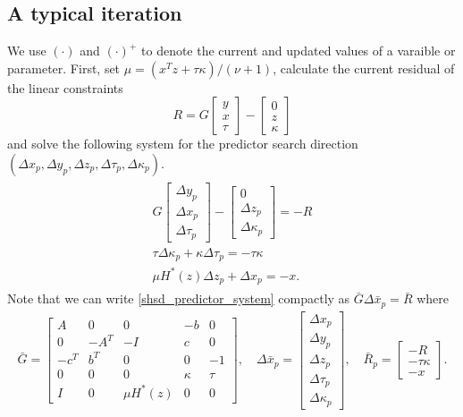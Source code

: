 \documentclass[11pt]{article}
\theoremstyle{definition}
\theoremstyle{plain}
\begin{document}
\subsection{A typical iteration}
We use $(\cdot)$ and $(\cdot)^+$ to denote the current and updated values of a varaible or parameter. First, set $\mu = \left(x^T z + \tau \kappa\right)/\left(\nu+1\right)$, calculate the current residual of the linear constraints
\[R = G \begin{bmatrix}
y \\ x \\ \tau
\end{bmatrix} - 
\begin{bmatrix}
0 \\ z \\ \kappa 
\end{bmatrix}\]
and solve the following system for the predictor search direction $(\Delta x_p, \Delta y_p, \Delta z_p, \Delta \tau_p, \Delta \kappa_p)$.
\begin{align}
\begin{split}
G\begin{bmatrix}
\Delta y_p \\ \Delta x_p \\ \Delta \tau_p
\end{bmatrix} - 
\begin{bmatrix}
0 \\ \Delta z_p \\ \Delta \kappa_p
\end{bmatrix} = -R \\[1ex]
\tau\Delta \kappa_p+\kappa\Delta \tau_p = -\tau\kappa \\[1ex]
\mu H^*(z)\Delta z_p + \Delta x_p = -x. 
\end{split}	 \label{shsd_predictor_system}
\end{align}
Note that we can write \eqref{shsd_predictor_system} compactly as $\bar G \Delta \bar{x}_p = \bar{R}$ where 
\begin{align} \label{G_bar_etc_def}
\bar{G} = \begin{bmatrix}
A & 0 &0 & -b & 0 \\
0 & -A^T & -I & c & 0 \\
-c^T & b^T & 0 & 0 & -1 \\
0 & 0 & 0 & \kappa & \tau \\
I & 0 & \mu H^*(z) & 0 & 0 
\end{bmatrix},\quad \Delta \bar{x}_p = \begin{bmatrix}
\Delta x_p \\ \Delta y_p \\ \Delta z_p \\ \Delta \tau_p \\ \Delta \kappa_p
\end{bmatrix},\quad \bar{R}_p = \begin{bmatrix}
-R \\ -\tau\kappa \\ -x
\end{bmatrix}.\end{align}
\end{document}
